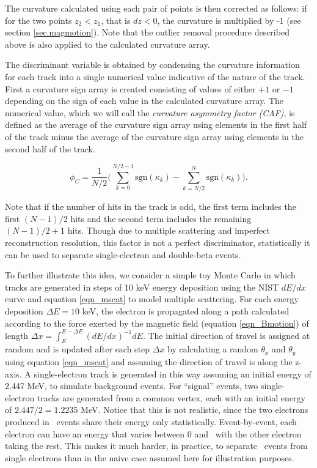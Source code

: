 \documentclass{JINST}
\begin{document}
The curvature calculated using each pair of points is then corrected as follows: if for the two points $z_2 < z_1$, that is 
$dz < 0$, the curvature is multiplied by -1 (see section \ref{sec.magmotion}).  Note that the outlier removal procedure described above is also applied to the calculated curvature array.  

The discriminant variable is obtained by condensing the curvature information for each track into a single numerical value indicative of the nature of the track.  First a curvature sign array is created 
consisting of values of either $+1$ or $-1$ depending on the sign of each value in the calculated curvature array.  The 
numerical value, which we will
call the {\em curvature asymmetry factor (CAF)}, is defined as the average of the curvature sign array using elements in the first half of 
the track minus the average of the curvature sign array using elements in the second half of the track.  

\begin{equation}\label{eqn_assym}
\phi_{C} = \frac{1}{N/2}\Biggl(\sum_{k=0}^{N/2-1}\mathrm{sgn}(\kappa_{k}) - \sum_{k=N/2}^{N}\mathrm{sgn}(\kappa_{k})\Biggr).
\end{equation}

Note that if the number of hits in the track is odd, the first term includes the first $(N-1)/2$ hits and
the second term includes the remaining $(N-1)/2 + 1$ hits.  Though due to multiple scattering and imperfect
reconstruction resolution, this factor is not a perfect discriminator, statistically it can be used to separate 
single-electron and double-beta events.

To further illustrate this idea, we consider a simple toy Monte Carlo in which tracks are generated in steps of 10 keV energy
deposition using the NIST $dE/dx$ curve and equation \ref{eqn_mscat} to model multiple scattering.  For each energy 
deposition $\Delta E = 10$ keV, the electron is propagated along a path calculated according to the force exerted
by the magnetic field (equation \ref{eqn_Bmotion}) of length $\Delta x = \int_{E}^{E-\Delta E}(dE/dx)^{-1}dE$.   The
initial direction of travel is assigned at random and is updated after each step $\Delta x$ 
by calculating a random $\theta_x$ and $\theta_y$ using equation \ref{eqn_mscat} and
assuming the direction of travel is along the z-axis.  A single-electron track is generated in this way 
assuming an initial energy of 2.447 MeV, to simulate background events.  For ``signal'' events, two 
single-electron tracks are generated from a common vertex, each with an initial energy of $2.447/2 = 1.2235$ MeV. Notice that this is not realistic, since the two electrons produced in \bbonu\ events share their energy only statistically. Event-by-event, each electron can have an energy that varies between 0 and \Qbb\, with the other electron taking the rest. This makes it much harder, in practice, to separate \bbonu\ events from single electrons than in the naive case assumed here for illustration purposes.
\end{document}
